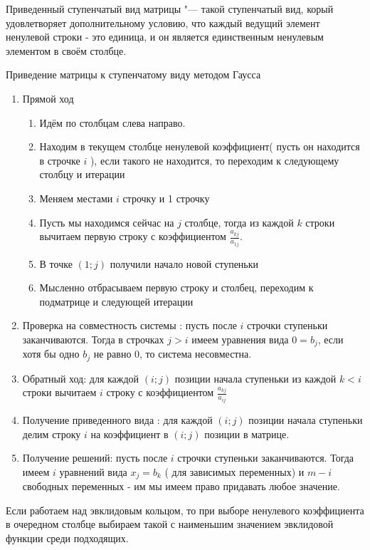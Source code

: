 \begin{Def}
Приведенный ступенчатый вид матрицы "--- такой ступенчатый вид, корый удовлетворяет дополнительному условию, что каждый ведущий элемент ненулевой строки - это единица, и он является единственным ненулевым элементом в своём столбце.
\end{Def}
\begin{Def}
Приведение матрицы к ступенчатому виду методом Гаусса 
\begin{enumerate}
\item Прямой ход
\begin{enumerate}
\item Идём по столбцам слева направо. 
\item Находим в текущем столбце ненулевой коэффициент( пусть он находится в строчке $i$ ), если такого не находится, то переходим к следующему столбцу и итерации
\item Меняем местами $i$ строчку и 1 строчку
\item Пусть мы находимся сейчас на $j$ столбце, тогда из каждой $k$ строки вычитаем первую строку с коэффициентом $\frac{a_{kj}}{a_{1j}}$. 
\item В точке $(1;j)$ получили начало новой ступеньки
\item Мысленно отбрасываем первую строку и столбец, переходим к подматрице и следующей итерации
\end{enumerate}
\item Проверка на совместность системы : пусть после $i$ строчки ступеньки заканчиваются. Тогда в строчках $j>i$ имеем уравнения вида $0=b_j$, если хотя бы одно $b_j$ не равно 0, то система несовместна. 
\item Обратный ход: для каждой $(i;j)$ позиции начала ступеньки из каждой $k < i$ строки вычитаем $i$ строку с коэффициентом $\frac{a_{kj}}{a_{ij}}$
\item Получение приведенного вида : для каждой $(i;j)$ позиции начала ступеньки делим строку $i$ на коэффициент в $(i;j)$ позиции в матрице.
\item Получение решений: пусть после $i$ строчки ступеньки заканчиваются. Тогда имеем $i$ уравнений вида $x_j=b_k$ ( для зависимых переменных) и $m-i$ свободных переменных - им мы имеем право придавать любое значение. 
\end{enumerate}
\begin{Rem}
Если работаем над эвклидовым кольцом, то при выборе ненулевого коэффициента в очередном столбце выбираем такой с наименьшим значением эвклидовой функции среди подходящих.
\end{Rem}
\end{Def}